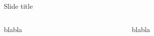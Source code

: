 \begin{frame}{Slide title}

\begin{columns}
    \begin{column}{0.5\textwidth}
    blabla
    \end{column}

    \begin{column}{0.5\textwidth}
    blabla
    \end{column}
\end{columns}

\end{frame}